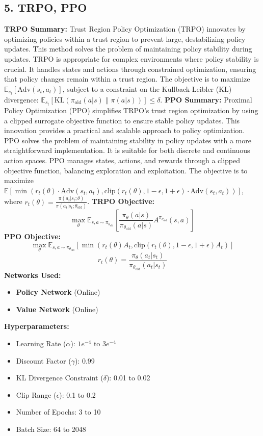 \documentclass[a4paper,10pt]{article}
\begin{document}
\begin{multicols}{2}
\section*{5. TRPO, PPO}
\textbf{TRPO Summary:} Trust Region Policy Optimization (TRPO) innovates by optimizing policies within a trust region to prevent large, destabilizing policy updates. This method solves the problem of maintaining policy stability during updates. TRPO is appropriate for complex environments where policy stability is crucial. It handles states and actions through constrained optimization, ensuring that policy changes remain within a trust region. The objective is to maximize \( \mathbb{E}_{s_t} \left[ \text{Adv}(s_t, a_t) \right] \), subject to a constraint on the Kullback-Leibler (KL) divergence: \( \mathbb{E}_{s_t} \left[ \text{KL}(\pi_{\text{old}}(a|s) \| \pi(a|s)) \right] \leq \delta \).
\textbf{PPO Summary:} Proximal Policy Optimization (PPO) simplifies TRPO’s trust region optimization by using a clipped surrogate objective function to ensure stable policy updates. This innovation provides a practical and scalable approach to policy optimization. PPO solves the problem of maintaining stability in policy updates with a more straightforward implementation. It is suitable for both discrete and continuous action spaces. PPO manages states, actions, and rewards through a clipped objective function, balancing exploration and exploitation. The objective is to maximize \( \mathbb{E} \left[ \min \left( r_t(\theta) \cdot \text{Adv}(s_t, a_t), \text{clip}(r_t(\theta), 1 - \epsilon, 1 + \epsilon) \cdot \text{Adv}(s_t, a_t) \right) \right] \), where \( r_t(\theta) = \frac{\pi(a_t | s_t; \theta)}{\pi(a_t | s_t; \theta_{\text{old}})} \).
\textbf{TRPO Objective:}
\[
\max_\theta \mathbb{E}_{s, a \sim \pi_{\theta_{\text{old}}}} \left[ \frac{\pi_\theta(a|s)}{\pi_{\theta_{\text{old}}}(a|s)} A^{\pi_{\theta_{\text{old}}}}(s, a) \right]
\]
\textbf{PPO Objective:}
\[
\max_\theta \mathbb{E}_{s, a \sim \pi_{\theta_{\text{old}}}} \left[ \min\left( r_t(\theta) A_t, \text{clip}(r_t(\theta), 1-\epsilon, 1+\epsilon) A_t \right) \right]
\]
\[
r_t(\theta) = \frac{\pi_\theta(a_t | s_t)}{\pi_{\theta_{\text{old}}}(a_t | s_t)}
\]
\textbf{Networks Used:}
\begin{itemize}
    \item \textbf{Policy Network} (Online)
    \item \textbf{Value Network} (Online)
\end{itemize}
\textbf{Hyperparameters:}
\begin{itemize}
    \item Learning Rate (\(\alpha\)): \(1e^{-4}\) to \(3e^{-4}\)
    \item Discount Factor (\(\gamma\)): 0.99
    \item KL Divergence Constraint (\(\delta\)): 0.01 to 0.02
    \item Clip Range (\(\epsilon\)): 0.1 to 0.2
    \item Number of Epochs: 3 to 10
    \item Batch Size: 64 to 2048
\end{itemize}


\end{multicols}
\end{document}
